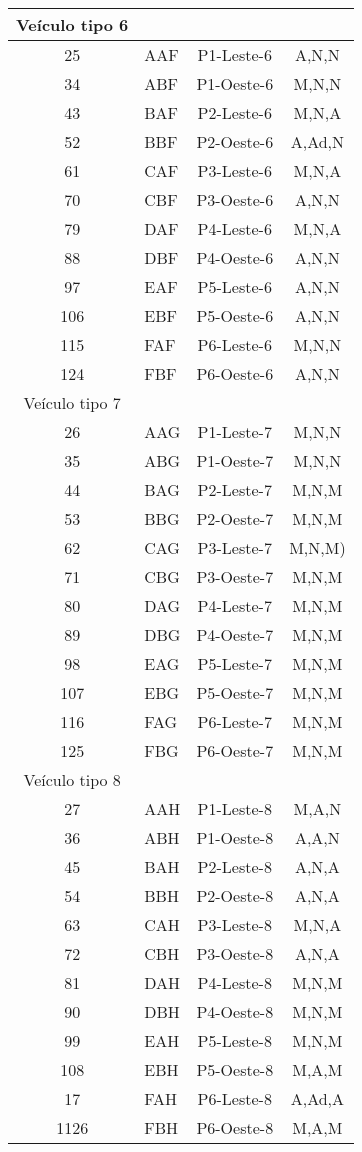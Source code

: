 \documentclass[
	12pt,				%
	openright,			%
	twoside,			%
	a4paper,			%
	english,			%
	french,				%
	spanish,			%
	brazil				%
	]{abntex2}
\begin{document}
\begin{apendicesenv}
\begin{table}[h]
\begin{tabular}{c l c c}
\hline
Veículo tipo 6 & \\
\hline

25 & AAF & P1-Leste-6 & A,N,N\\
34 & ABF & P1-Oeste-6 & M,N,N\\
43 & BAF & P2-Leste-6 & M,N,A\\
52 & BBF & P2-Oeste-6 & A,Ad,N\\
61 & CAF & P3-Leste-6 & M,N,A\\
70 & CBF & P3-Oeste-6 & A,N,N\\
79 & DAF & P4-Leste-6 & M,N,A\\
88 & DBF & P4-Oeste-6 & A,N,N\\
97 & EAF & P5-Leste-6 & A,N,N\\
106 & EBF & P5-Oeste-6 & A,N,N\\
115 & FAF & P6-Leste-6 & M,N,N\\
124 & FBF & P6-Oeste-6 & A,N,N\\

\hline
Veículo tipo 7 & \\
\hline

26 & AAG & P1-Leste-7 & M,N,N\\
35 & ABG & P1-Oeste-7 & M,N,N\\
44 & BAG & P2-Leste-7 & M,N,M\\
53 & BBG & P2-Oeste-7 & M,N,M\\
62 & CAG & P3-Leste-7 & M,N,M)\\
71 & CBG & P3-Oeste-7 & M,N,M\\
80 & DAG & P4-Leste-7 & M,N,M\\
89 & DBG & P4-Oeste-7 & M,N,M\\
98 & EAG & P5-Leste-7 & M,N,M\\
107 & EBG & P5-Oeste-7 & M,N,M\\
116 & FAG & P6-Leste-7 & M,N,M\\
125 & FBG & P6-Oeste-7 & M,N,M\\


\hline
Veículo tipo 8 & \\
\hline
27 & AAH & P1-Leste-8 & M,A,N\\
36 & ABH & P1-Oeste-8 & A,A,N\\
45 & BAH & P2-Leste-8 & A,N,A\\
54 & BBH & P2-Oeste-8 & A,N,A\\
63 & CAH & P3-Leste-8 & M,N,A\\
72 & CBH & P3-Oeste-8 & A,N,A\\
81 & DAH & P4-Leste-8 & M,N,M\\
90 & DBH & P4-Oeste-8 & M,N,M\\
99 & EAH & P5-Leste-8 & M,N,M\\
108 & EBH & P5-Oeste-8 & M,A,M\\
17 & FAH & P6-Leste-8 & A,Ad,A\\
1126 & FBH & P6-Oeste-8 & M,A,M\\



\end{tabular}
\end{table}
\end{apendicesenv}
\end{document}
